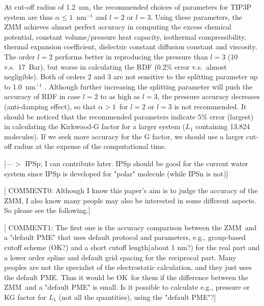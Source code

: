 \documentclass[a4paper,preprint,unsortedaddress,onecolumn,fleqn]{revtex4}
\begin{document}
At cut-off radius of 1.2~nm, the recommended choices of parameters for TIP3P
system are thus $\alpha \leq 1$~$\text{nm}^{-1}$ and $l=2$ or $l=3$. Using
these parameters, the ZMM achieves almost perfect accuracy in computing the
excess chemical potential, constant volume/pressure heat capacity,
isothermal compressibility, thermal expansion coefficient, dielectric
constant diffusion constant and viscosity. The order $l=2$ performs better
in reproducing the pressure than $l=3$ (10 v.s.~17~Bar), but worse in
calculating the RDF (0.2\% error v.s.~almost negligible). Both of orders 2
and 3 are not sensitive to the splitting parameter up to 1.0~$\text{nm}^{-1}$%
. Although further increasing the splitting parameter will push the accuracy
of RDF in case $l=2 $ to as high as $l=3$, the pressure accuracy decreases
(anti-damping effect), so that $\alpha >1$\ for $l=2$ or $l=3$ is not
recommended. It should be noticed that the recommended parameters indicate $%
5 $\% error (largest) in calculating the Kirkwood-G factor for a larger
system ($L_{1}$ containing 13,824 molecules). If we seek more accuracy for
the G factor, we should use a larger cut-off radius at the expense of the
computational time. %

[{\color{blue}---$>$ IPSp; I can contribute later. IPSp should be good for
the current water system since IPSp is developed for "polar" molecule (while
IPSn is not)}]

[ {\color{blue} COMMENT0: Although I know this paper's aim is to judge the
accuracy of the ZMM, I also know many people may also be interested in some
different aspects. So please see the following.}]

[ {\color{blue} COMMENT1: The first one is the accuracy comparison between
the ZMM\ and a "default PME" that uses default protocol and parameters,
e.g., group-based cutoff scheme (OK?) and a short cutoff length(about 1 nm?)
for the real part and a lower order spline and default grid spacing for the
reciprocal part. Many peoples are not the specialist of the electrostatic
calculation, and they just uses the default PME. Thus it would be OK\ for
them if the difference between the ZMM\ and a "default PME" is small. Is it
possible to calculate e.g., pressure or KG factor for {$L_{1}$} (n{ot all
the quantities}), using the {"default PME"?}}]
\end{document}
